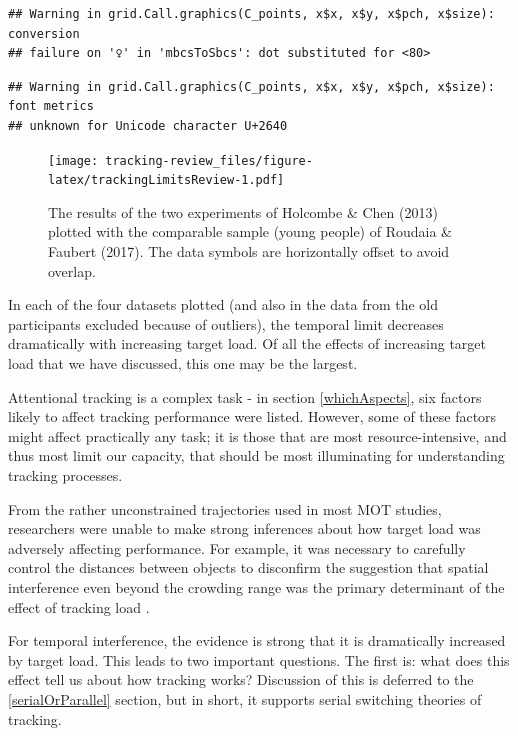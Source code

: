 \documentclass[
]{book}
\begin{document}
\begin{verbatim}
## Warning in grid.Call.graphics(C_points, x$x, x$y, x$pch, x$size): conversion
## failure on '♀' in 'mbcsToSbcs': dot substituted for <80>
\end{verbatim}

\begin{verbatim}
## Warning in grid.Call.graphics(C_points, x$x, x$y, x$pch, x$size): font metrics
## unknown for Unicode character U+2640
\end{verbatim}

\begin{figure}
\centering
\texttt{[image: tracking-review\_files/figure-latex/trackingLimitsReview-1.pdf]}
\caption{\label{fig:trackingLimitsReview}The results of the two experiments of Holcombe \& Chen (2013) plotted with the comparable sample (young people) of Roudaia \& Faubert (2017). The data symbols are horizontally offset to avoid overlap.}
\end{figure}

In each of the four datasets plotted (and also in the data from the old participants excluded because of outliers), the temporal limit decreases dramatically with increasing target load. Of all the effects of increasing target load that we have discussed, this one may be the largest.

Attentional tracking is a complex task - in section \ref{whichAspects}, six factors likely to affect tracking performance were listed. However, some of these factors might affect practically any task; it is those that are most resource-intensive, and thus most limit our capacity, that should be most illuminating for understanding tracking processes.

From the rather unconstrained trajectories used in most MOT studies, researchers were unable to make strong inferences about how target load was adversely affecting performance. For example, it was necessary to carefully control the distances between objects to disconfirm the suggestion that spatial interference even beyond the crowding range was the primary determinant of the effect of tracking load \citep{holcombeObjectTrackingAbsence2014, holcombeCommentCapacityLimits2019}.

For temporal interference, the evidence is strong that it is dramatically increased by target load. This leads to two important questions. The first is: what does this effect tell us about how tracking works? Discussion of this is deferred to the \ref{serialOrParallel} section, but in short, it supports serial switching theories of tracking.
\end{document}
